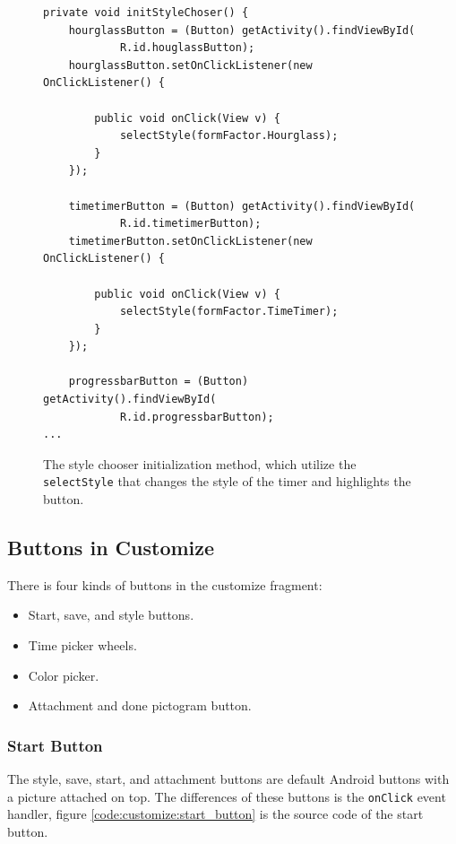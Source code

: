 \begin{figure}[H]
\begin{lstlisting}
private void initStyleChoser() {
	hourglassButton = (Button) getActivity().findViewById(
			R.id.houglassButton);
	hourglassButton.setOnClickListener(new OnClickListener() {

		public void onClick(View v) {
			selectStyle(formFactor.Hourglass);
		}
	});

	timetimerButton = (Button) getActivity().findViewById(
			R.id.timetimerButton);
	timetimerButton.setOnClickListener(new OnClickListener() {

		public void onClick(View v) {
			selectStyle(formFactor.TimeTimer);
		}
	});

	progressbarButton = (Button) getActivity().findViewById(
			R.id.progressbarButton);
...
\end{lstlisting}
\caption{The style chooser initialization method, which utilize the \texttt{selectStyle} that changes the style of the timer and highlights the button.}%
\label{code:customize:style_choser}%
\end{figure}

\subsection*{Buttons in Customize}
There is four kinds of buttons in the customize fragment:

\begin{itemize}
	\item Start, save, and style buttons.
	\item Time picker wheels.
	\item Color picker.
	\item Attachment and done pictogram button.
\end{itemize}

\subsubsection*{Start Button}
The style, save, start, and attachment buttons are default Android buttons with a picture attached on top.
The differences of these buttons is the \texttt{onClick} event handler, figure \ref{code:customize:start_button} is the source code of the start button.

